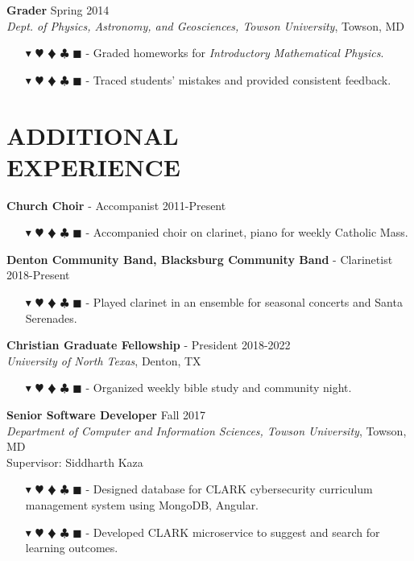 \documentclass[overlapped, 10pt]{res} %
\newcommand{\physics}{$\blacktriangledown$}
\newcommand{\biochem}{$\varheartsuit$}
\newcommand{\shannon}{$\vardiamondsuit$}
\newcommand{\classic}{$\clubsuit$}
\newcommand{\quantum}{$\blacksquare$}
\newcommand{\physicscolor}{\color{YellowOrange}}
\newcommand{\biochemcolor}{\color{Emerald}}
\newcommand{\shannoncolor}{\color{Goldenrod}}
\newcommand{\classiccolor}{\color{Cyan}}
\newcommand{\quantumcolor}{\color{RedOrange}}
\newcommand{\tag}[1]{
    {\IfSubStr{#1}{\physics}{\physicscolor}{\color{White}}\physics}
    {\IfSubStr{#1}{\biochem}{\biochemcolor}{\color{White}}\biochem}
    {\IfSubStr{#1}{\shannon}{\shannoncolor}{\color{White}}\shannon}
    {\IfSubStr{#1}{\classic}{\classiccolor}{\color{White}}\classic}
    {\IfSubStr{#1}{\quantum}{\quantumcolor}{\color{White}}\quantum}
}
\begin{document}
\begin{resume}
\textbf{Grader} \hfill Spring 2014 \\
\textit{Dept. of Physics, Astronomy, and Geosciences, Towson University}, Towson, MD
\begin{itemize} \itemsep -2pt %
\item[\tag{\physics}-] Graded homeworks for \textit{Introductory Mathematical Physics}.
\item[\tag{\physics}-] Traced students' mistakes and provided consistent feedback.
\end{itemize}


\section{ADDITIONAL\\EXPERIENCE}

\textbf{Church Choir} - Accompanist \hfill 2011-Present
\begin{itemize} \itemsep -2pt %
\item[\tag{}-] Accompanied choir on clarinet, piano for weekly Catholic Mass.
\end{itemize}

\textbf{Denton Community Band, Blacksburg Community Band} - Clarinetist \hfill 2018-Present
\begin{itemize} \itemsep -2pt %
\item[\tag{}-] Played clarinet in an ensemble for seasonal concerts and Santa Serenades.
\end{itemize}

\textbf{Christian Graduate Fellowship} - President \hfill 2018-2022 \\
\textit{University of North Texas}, Denton, TX
\begin{itemize} \itemsep -2pt %
\item[\tag{}-] Organized weekly bible study and community night.
\end{itemize}

\textbf{Senior Software Developer} \hfill Fall 2017 \\
\textit{Department of Computer and Information Sciences, Towson University}, Towson, MD \\
Supervisor: Siddharth Kaza
\begin{itemize} \itemsep -2pt %
\item[\tag{\classic}-] Designed database for CLARK cybersecurity curriculum management system using MongoDB, Angular.
\item[\tag{\classic}-] Developed CLARK microservice to suggest and search for learning outcomes.
\end{itemize}


\end{resume}
\end{document}
